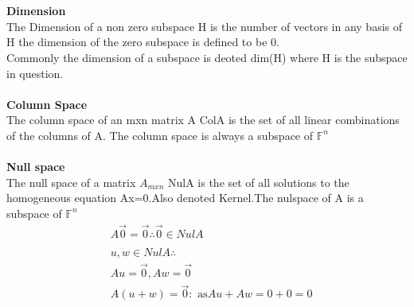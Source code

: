 \documentclass[12pt]{article}
\newcommand{\F}{\mathbb{F}}
\begin{document}
\\\\
\textbf{Dimension}\\
The Dimension of a non zero subspace H is the number of vectors in any basis of H the dimension of the zero subspace is defined to be 0. \\
Commonly the dimension of a subspace is deoted dim(H) where H is the subspace in question.
\\\\
\textbf{Column Space}\\
The column space of an mxn matrix A ColA is the set of all linear combinations of the columns of A. The column space is always a subspace of $\F^n$
\\\\
\textbf{Null space}\\
The null space of a matrix $A_{mxn}$ NulA is the set of all solutions to the homogeneous equation Ax=0.Also denoted Kernel.The nulspace of A is a subspace of $\F^n$\\
\begin{align*}
  &A\vec{0}=\vec{0} \therefore \vec{0} \in NulA\\\\
  &u,w \in NulA \therefore \\&Au=\vec{0}, Aw=\vec{0}\\
  &A(u+w)=\vec{0}: \text{ as} Au+Aw=0+0=0
\end{align*}
\\\\
\end{document}
